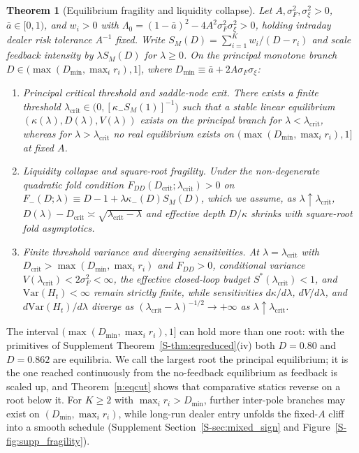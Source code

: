 \documentclass[11pt,letterpaper]{article}
\newtheorem{theorem}{Theorem}[section]
\theoremstyle{definition}
\newcommand{\Var}{\mathrm{Var}}
\begin{document}
\begin{theorem}[Equilibrium fragility and liquidity collapse]\label{thm:fragility}
Let $A, \sigma_F^2, \sigma_\xi^2 > 0$, $\bar{a} \in [0, 1)$, and $w_i > 0$ with $\Lambda_0 = (1 - \bar{a})^2 - 4 A^2 \sigma_F^2 \sigma_\xi^2 > 0$, holding intraday dealer risk tolerance $A^{-1}$ fixed. Write $S_M(D) = \sum_{i=1}^K w_i/(D - r_i)$ and scale feedback intensity by $\lambda S_M(D)$ for $\lambda \ge 0$. On the principal monotone branch $D \in (\max(D_{\min}, \max_i r_i), 1]$, where $D_{\min} \equiv \bar{a} + 2 A \sigma_F \sigma_\xi$:
\begin{enumerate}
  \item[(i)] \emph{Principal critical threshold and saddle-node exit.} There exists a finite threshold $\lambda_{\mathrm{crit}} \in \bigl(0, [\kappa_- S_M(1)]^{-1}\bigr)$ such that a stable linear equilibrium $(\kappa(\lambda), D(\lambda), V(\lambda))$ exists on the principal branch for $\lambda < \lambda_{\mathrm{crit}}$, whereas for $\lambda > \lambda_{\mathrm{crit}}$ no real equilibrium exists on $(\max(D_{\min}, \max_i r_i), 1]$ at fixed $A$.
  \item[(ii)] \emph{Liquidity collapse and square-root fragility.} Under the non-degenerate quadratic fold condition $F_{DD}(D_{\mathrm{crit}}; \lambda_{\mathrm{crit}}) > 0$ on $F_-(D; \lambda) \equiv D - 1 + \lambda \kappa_-(D) S_M(D)$, which we assume, as $\lambda \uparrow \lambda_{\mathrm{crit}}$, $D(\lambda) - D_{\mathrm{crit}} \asymp \sqrt{\lambda_{\mathrm{crit}} - \lambda}$ and effective depth $D/\kappa$ shrinks with square-root fold asymptotics.
  \item[(iii)] \emph{Finite threshold variance and diverging sensitivities.} At $\lambda = \lambda_{\mathrm{crit}}$ with $D_{\mathrm{crit}} > \max(D_{\min}, \max_i r_i)$ and $F_{DD} > 0$, conditional variance $V(\lambda_{\mathrm{crit}}) < 2\sigma_F^2 < \infty$, the effective closed-loop budget $S^*(\lambda_{\mathrm{crit}}) < 1$, and $\Var(H_t) < \infty$ remain strictly finite, while sensitivities $d\kappa/d\lambda$, $dV/d\lambda$, and $d\Var(H_t)/d\lambda$ diverge as $(\lambda_{\mathrm{crit}} - \lambda)^{-1/2} \to +\infty$ as $\lambda \uparrow \lambda_{\mathrm{crit}}$.
\end{enumerate}
\end{theorem}

The interval $(\max(D_{\min}, \max_i r_i), 1]$ can hold more than one root: with the primitives of Supplement Theorem~\ref{S-thm:eqreduced}(iv) both $D = 0.80$ and $D = 0.862$ are equilibria. We call the largest root the principal equilibrium; it is the one reached continuously from the no-feedback equilibrium as feedback is scaled up, and Theorem~\ref{n:eqcut} shows that comparative statics reverse on a root below it. For $K \ge 2$ with $\max_i r_i > D_{\min}$, further inter-pole branches may exist on $(D_{\min}, \max_i r_i)$, while long-run dealer entry unfolds the fixed-$A$ cliff into a smooth schedule (Supplement Section~\ref{S-sec:mixed_sign} and Figure~\ref{S-fig:supp_fragility}).
\end{document}
